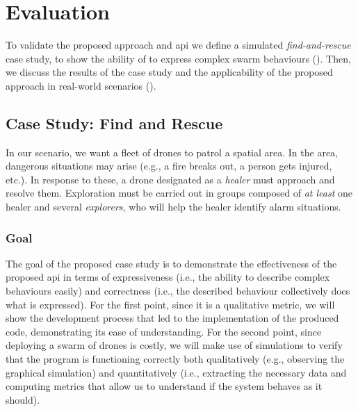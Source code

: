 \section{Evaluation}
\label{sec:eval}

To validate the proposed approach and \ac{api} we define a simulated \emph{find-and-rescue} case study,
to show 
the ability of \MacroSwarm{} to express complex swarm behaviours (). 
Then, we discuss the results of the case study and the applicability of the proposed approach in real-world scenarios ().

\subsection{Case Study: Find and Rescue}\label{subsec:case-study}
In our scenario, we want a fleet of drones to patrol a spatial area.
% 
In the area, dangerous situations may arise (e.g., a fire breaks out, a person gets injured, etc.). 
%
 In response to these, a drone designated as a \emph{healer} 
 must approach and resolve them. %
%
Exploration must be carried out in groups composed of \emph{at least} one 
 healer and several \emph{explorers}, who will help the healer identify alarm situations.

\subsubsection{Goal}
The goal of the proposed case study is to demonstrate the effectiveness of the proposed \ac{api} in terms of expressiveness (i.e., the ability to describe complex behaviours easily) and correctness (i.e., the described behaviour collectively does what is expressed). 
%
For the first point, since it is a qualitative metric, we will show the development process that led to the implementation of the produced code, demonstrating its ease of understanding. 
%
For the second point, since deploying a swarm of drones is costly, we will make use of simulations to verify that the program is functioning correctly both qualitatively (e.g., observing the graphical simulation) and quantitatively (i.e., extracting the necessary data and computing metrics that allow us to understand if the system behaves as it should).
%
%

